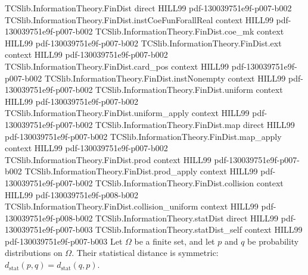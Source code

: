 \begin{theorem}
\label{TCSlib.InformationTheory.statDist_comm}
\leanok
\proofstep
  {TCSlib.InformationTheory.FinDist}
  {direct}
  {HILL99}
  {pdf-130039751e9f-p007-b002}
\proofstep
  {TCSlib.InformationTheory.FinDist.instCoeFunForallReal}
  {context}
  {HILL99}
  {pdf-130039751e9f-p007-b002}
\proofstep
  {TCSlib.InformationTheory.FinDist.coe_mk}
  {context}
  {HILL99}
  {pdf-130039751e9f-p007-b002}
\proofstep
  {TCSlib.InformationTheory.FinDist.ext}
  {context}
  {HILL99}
  {pdf-130039751e9f-p007-b002}
\proofstep
  {TCSlib.InformationTheory.FinDist.card_pos}
  {context}
  {HILL99}
  {pdf-130039751e9f-p007-b002}
\proofstep
  {TCSlib.InformationTheory.FinDist.instNonempty}
  {context}
  {HILL99}
  {pdf-130039751e9f-p007-b002}
\proofstep
  {TCSlib.InformationTheory.FinDist.uniform}
  {context}
  {HILL99}
  {pdf-130039751e9f-p007-b002}
\proofstep
  {TCSlib.InformationTheory.FinDist.uniform_apply}
  {context}
  {HILL99}
  {pdf-130039751e9f-p007-b002}
\proofstep
  {TCSlib.InformationTheory.FinDist.map}
  {direct}
  {HILL99}
  {pdf-130039751e9f-p007-b002}
\proofstep
  {TCSlib.InformationTheory.FinDist.map_apply}
  {context}
  {HILL99}
  {pdf-130039751e9f-p007-b002}
\proofstep
  {TCSlib.InformationTheory.FinDist.prod}
  {context}
  {HILL99}
  {pdf-130039751e9f-p007-b002}
\proofstep
  {TCSlib.InformationTheory.FinDist.prod_apply}
  {context}
  {HILL99}
  {pdf-130039751e9f-p007-b002}
\proofstep
  {TCSlib.InformationTheory.FinDist.collision}
  {context}
  {HILL99}
  {pdf-130039751e9f-p008-b002}
\proofstep
  {TCSlib.InformationTheory.FinDist.collision_uniform}
  {context}
  {HILL99}
  {pdf-130039751e9f-p008-b002}
\proofstep
  {TCSlib.InformationTheory.statDist}
  {direct}
  {HILL99}
  {pdf-130039751e9f-p007-b003}
\proofstep
  {TCSlib.InformationTheory.statDist_self}
  {context}
  {HILL99}
  {pdf-130039751e9f-p007-b003}
Let $\Omega$ be a finite set, and let $p$ and $q$ be probability distributions on
$\Omega$. Their statistical distance is symmetric:
$d_{\mathrm{stat}}(p,q)=d_{\mathrm{stat}}(q,p)$.
\end{theorem}

